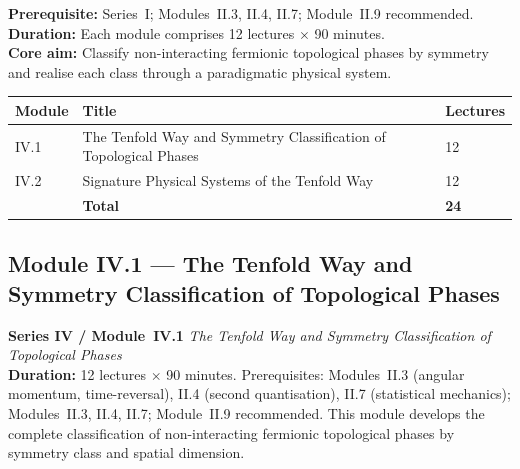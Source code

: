 \documentclass[11pt,a4paper]{article}
\begin{document}
\begin{tcolorbox}[seriesbox, title={Series~IV Overview}]
\textbf{Prerequisite:} Series~I; Modules~II.3, II.4, II.7; Module~II.9 recommended.\\
\textbf{Duration:} Each module comprises 12 lectures $\times$ 90 minutes.\\
\textbf{Core aim:} Classify non-interacting fermionic topological phases by symmetry
and realise each class through a paradigmatic physical system.\\[4pt]
{\footnotesize
\begin{center}
\begin{tabular}{@{}lp{4.2cm}p{6.8cm}@{}}
\toprule
\textbf{Module} & \textbf{Title} & \textbf{Lectures}\\
\midrule
IV.1 & The Tenfold Way and Symmetry Classification of Topological Phases & 12\\
IV.2 & Signature Physical Systems of the Tenfold Way & 12\\
\midrule
 & \textbf{Total} & \textbf{24}\\
\bottomrule
\end{tabular}
\end{center}
}
\end{tcolorbox}

\newpage

\subsection{Module IV.1 --- The Tenfold Way and Symmetry Classification of Topological Phases}
\label{sec:mod-IV1}

\begin{tcolorbox}[seriesbox]
  \textbf{Series IV / Module~IV.1} \quad
  \textit{The Tenfold Way and Symmetry Classification of Topological Phases}\\[4pt]
  \textbf{Duration:} 12 lectures $\times$ 90 minutes.
  Prerequisites: Modules~II.3 (angular momentum, time-reversal),
  II.4 (second quantisation), II.7 (statistical mechanics);
  Modules~II.3, II.4, II.7; Module~II.9 recommended.
  This module develops the complete classification of non-interacting
  fermionic topological phases by symmetry class and spatial dimension.
\end{tcolorbox}

\medskip
\end{document}
